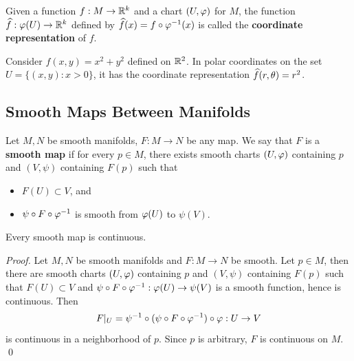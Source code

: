 \begin{definition}
    Given a function $f:M \to \mathbb{R}^k$ and a chart $(U, \varphi)$ for $M$, the function $\widehat{f}: \varphi(U) \to \mathbb{R}^k$ defined by $\widehat{f}(x) = f \circ \varphi^{-1}(x)$ is called the \textbf{coordinate representation} of $f$. 
\end{definition}
\begin{example}
    Consider $f(x,y)=x^2+y^2$ defined on $\mathbb{R}^2$. In polar coordinates on the set $U=\{(x,y):x>0\}$, it has the coordinate representation $\widehat{f}(r,\theta) = r^2$.
\end{example}
\subsection{Smooth Maps Between Manifolds}
\begin{definition}
    Let $M,N$ be smooth manifolds, $F:M \to N$ be any map. 
    We say that $F$ is a \textbf{smooth map} if for every $p \in M$, there exists smooth charts $(U, \varphi)$ containing $p$ and $(V, \psi)$ containing $F(p)$ such that 
    \begin{itemize}
        \item $F(U) \subset V$, and 
        \item $\psi \circ F \circ \varphi^{-1}$ is smooth from $\varphi(U)$ to $\psi(V)$. 
    \end{itemize}
\end{definition}
\begin{proposition}
    Every smooth map is continuous. 
\end{proposition}
\begin{proof}
    Let $M,N$ be smooth  manifolds and $F:M \to N$ be smooth. Let $p \in M$, then there are smooth charts $(U,\varphi)$ containing $p$ and $(V,\psi)$ containing $F(p)$ such that $F(U) \subset V$ and 
    $\psi \circ F \circ \varphi^{-1}: \varphi(U) \to \psi(V)$ 
    is a smooth function, hence is continuous. Then 
    $$F|_U = \psi^{-1} \circ (\psi \circ F \circ \varphi^{-1}) \circ \varphi: U \to V$$
    is continuous in a neighborhood of $p$. Since $p$ is arbitrary, $F$ is continuous on $M$. \qed 
\end{proof}



